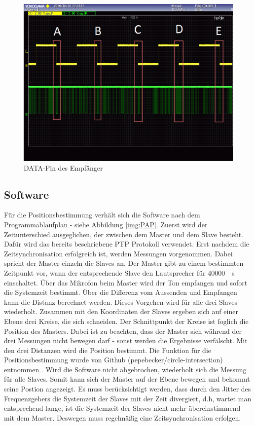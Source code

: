 \begin{figure}[H]
        \centering
        \hspace*{-1.7cm}
        \includegraphics[width=1.2\textwidth]{images/schmitt_trigger_billig_sender_bearbeitet.png}
        \caption{\si{DATA}-Pin des \funkempfaenger \platz Empfänger}    
        \label{img:ausgang_sender_pin}
\end{figure}

\subsection{Software}
Für die Positionsbestimmung verhält sich die Software nach dem Programmablaufplan - siehe Abbildung \ref{img:PAP}. Zuerst wird der Zeitunterschied ausgeglichen, der zwischen dem Master und dem Slave besteht. Dafür wird das bereits beschriebene PTP Protokoll verwendet. Erst nachdem die Zeitsynchronisation erfolgreich ist, werden Messungen vorgenommen. Dabei spricht der Master einzeln die Slaves an. Der Master gibt zu einem bestimmten Zeitpunkt vor, wann der entsprechende Slave den Lautsprecher für \SI{40000}{\mu\s} einschaltet. Über das Mikrofon beim Master wird der Ton empfangen und sofort die Systemzeit bestimmt. Über die Differenz vom Aussenden und Empfangen kann die Distanz berechnet werden. Dieses Vorgehen wird für alle drei Slaves wiederholt. Zusammen mit den Koordinaten der Slaves ergeben sich auf einer Ebene drei Kreise, die sich schneiden. Der Schnittpunkt der Kreise ist foglich die Position des Masters. Dabei ist zu beachten, dass der Master sich während der drei Messungen nicht bewegen darf - sonst werden die Ergebnisse verfälscht. Mit den drei Distanzen wird die Position bestimmt. Die Funktion für die Positionsbestimmung wurde von Github (pepebecker/circle-intersection) entnommen \cite{src_GITHUB_CODE}. Wird die Software nicht abgebrochen, wiederholt sich die Messung für alle Slaves. Somit kann sich der Master auf der Ebene bewegen und bekommt seine Postion angezeigt. Es muss berücksichtigt werden, dass durch den Jitter des Frequenzgebers die Systemzeit der Slaves mit der Zeit divergiert, d.h, wartet man entsprechend lange, ist die Systemzeit der Slaves nicht mehr übereinstimmend mit dem Master. Deswegen muss regelmäßig eine Zeitsynchronisation erfolgen.

